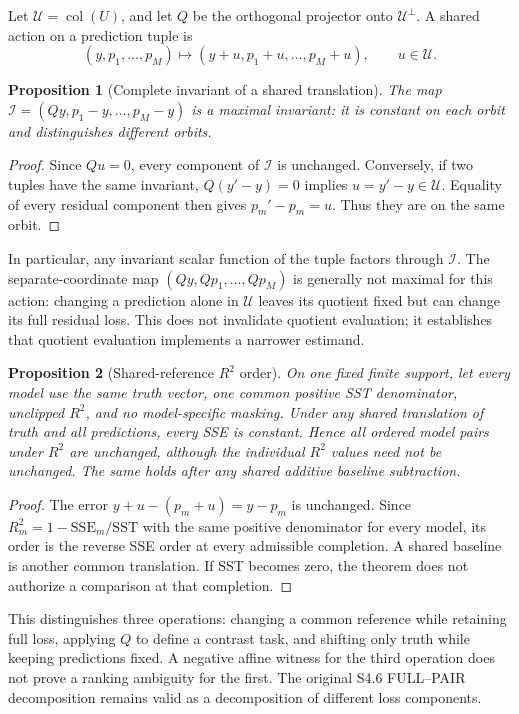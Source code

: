 \documentclass[11pt]{article}
\newtheorem{proposition}{Proposition}
\begin{document}
Let $\mathcal U=\operatorname{col}(U)$, and let $Q$ be the orthogonal projector onto $\mathcal U^\perp$. A shared action on a prediction tuple is
\[
(y,p_1,\ldots,p_M)\longmapsto(y+u,p_1+u,\ldots,p_M+u),\qquad u\in\mathcal U.
\]
\begin{proposition}[Complete invariant of a shared translation]
The map $\mathcal I=(Qy,p_1-y,\ldots,p_M-y)$ is a maximal invariant: it is constant on each orbit and distinguishes different orbits.
\end{proposition}
\begin{proof}
Since $Qu=0$, every component of $\mathcal I$ is unchanged. Conversely, if two tuples have the same invariant, $Q(y'-y)=0$ implies $u=y'-y\in\mathcal U$. Equality of every residual component then gives $p_m'-p_m=u$. Thus they are on the same orbit.
\end{proof}
In particular, any invariant scalar function of the tuple factors through $\mathcal I$. The separate-coordinate map $(Qy,Qp_1,\ldots,Qp_M)$ is generally not maximal for this action: changing a prediction alone in $\mathcal U$ leaves its quotient fixed but can change its full residual loss. This does not invalidate quotient evaluation; it establishes that quotient evaluation implements a narrower estimand.

\begin{proposition}[Shared-reference $R^2$ order]
On one fixed finite support, let every model use the same truth vector, one common positive SST denominator, unclipped $R^2$, and no model-specific masking. Under any shared translation of truth and all predictions, every SSE is constant. Hence all ordered model pairs under $R^2$ are unchanged, although the individual $R^2$ values need not be unchanged. The same holds after any shared additive baseline subtraction.
\end{proposition}
\begin{proof}
The error $y+u-(p_m+u)=y-p_m$ is unchanged. Since $R_m^2=1-\mathrm{SSE}_m/\mathrm{SST}$ with the same positive denominator for every model, its order is the reverse SSE order at every admissible completion. A shared baseline is another common translation. If SST becomes zero, the theorem does not authorize a comparison at that completion.
\end{proof}
This distinguishes three operations: changing a common reference while retaining full loss, applying $Q$ to define a contrast task, and shifting only truth while keeping predictions fixed. A negative affine witness for the third operation does not prove a ranking ambiguity for the first. The original S4.6 FULL--PAIR decomposition remains valid as a decomposition of different loss components.
\end{document}
